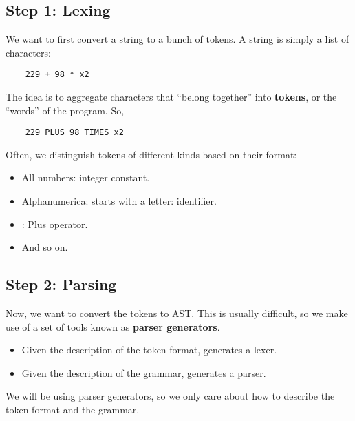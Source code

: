 \documentclass[letterpaper]{article}
\begin{document}
\subsection{Step 1: Lexing}
We want to first convert a string to a bunch of tokens. A string is simply a list of characters: 
\begin{verbatim}
    229 + 98 * x2\end{verbatim}
The idea is to aggregate characters that ``belong together'' into \textbf{tokens}, or the ``words'' of the program. So, 
\begin{verbatim}
    229 PLUS 98 TIMES x2\end{verbatim}
Often, we distinguish tokens of different kinds based on their format: 
\begin{itemize}
    \item All numbers: integer constant. 
    \item Alphanumerica: starts with a letter: identifier. 
    \item \code{+}: Plus operator.
    \item And so on.
\end{itemize}

\subsection{Step 2: Parsing}
Now, we want to convert the tokens to AST. This is usually difficult, so we make use of a set of tools known as \textbf{parser generators}. 
\begin{itemize}
    \item Given the description of the token format, generates a lexer. 
    \item Given the description of the grammar, generates a parser. 
\end{itemize}
We will be using parser generators, so we only care about how to describe the token format and the grammar. 
\end{document}
